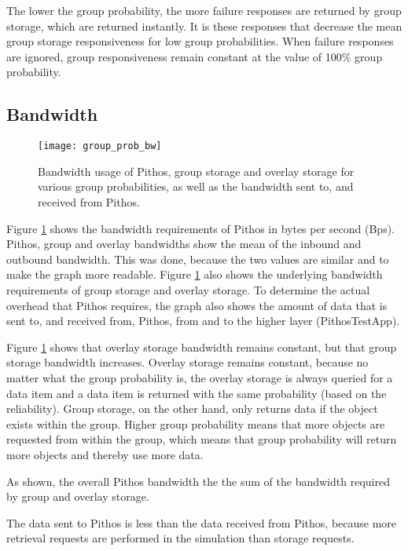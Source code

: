 The lower the group probability, the more failure responses are returned by group storage, which are returned instantly. It is these responses that decrease the mean group storage responsiveness for low group probabilities. When failure responses are ignored, group responsiveness remain constant at the value of 100\% group probability.

\subsection{Bandwidth}

\begin{figure}[htbp]
 \centering
 \texttt{[image: group\_prob\_bw]}
 \caption{Bandwidth usage of Pithos, group storage and overlay storage for various group probabilities, as well as the bandwidth sent to, and received from Pithos.}
 \label{fig_group_prob_bw}
\end{figure}
%
Figure \ref{fig_group_prob_bw} shows the bandwidth requirements of Pithos in bytes per second (Bps). Pithos, group and overlay bandwidths show the mean of the inbound and outbound bandwidth. This was done, because the two values are similar and to make the graph more readable. Figure \ref{fig_group_prob_bw} also shows the underlying bandwidth requirements of group storage and overlay storage. To determine the actual overhead that Pithos requires, the graph also shows the amount of data that is sent to, and received from, Pithos, from and to the higher layer (PithosTestApp).

Figure \ref{fig_group_prob_bw} shows that overlay storage bandwidth remains constant, but that group storage bandwidth increases. Overlay storage remains constant, because no matter what the group probability is, the overlay storage is always queried for a data item and a data item is returned with the same probability (based on the reliability). Group storage, on the other hand, only returns data if the object exists within the group. Higher group probability means that more objects are requested from within the group, which means that group probability will return more objects and thereby use more data.

As shown, the overall Pithos bandwidth the the sum of the bandwidth required by group and overlay storage.

The data sent to Pithos is less than the data received from Pithos, because more retrieval requests are performed in the simulation than storage requests.


